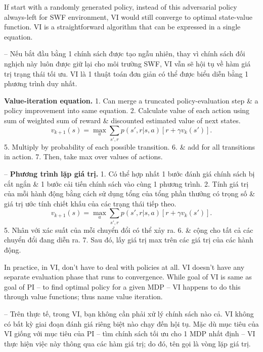 \documentclass{article}
\begin{document}
\begin{itemize}
\begin{itemize}
\begin{itemize}
            If start with a randomly generated policy, instead of this adversarial policy always-left for SWF environment, VI would still converge to optimal state-value function. VI is a straightforward algorithm that can be expressed in a single equation.

            -- Nếu bắt đầu bằng 1 chính sách được tạo ngẫu nhiên, thay vì chính sách đối nghịch này luôn được giữ lại cho môi trường SWF, VI vẫn sẽ hội tụ về hàm giá trị trạng thái tối ưu. VI là 1 thuật toán đơn giản có thể được biểu diễn bằng 1 phương trình duy nhất.

            {\bf Value-iteration equation.} 1. Can merge a truncated policy-evaluation step \& a policy improvement into same equation. 2. Calculate value of each action using sum of weighted sum of reward \& discounted estimated value of next states.
            \begin{equation*}
                v_{k+1}(s) = \max_a\sum_{s',r} p(s',r|s,a)[r + \gamma v_k(s')].
            \end{equation*}
            5. Multiply by probability of each possible transition. 6. \& add for all transitions in action. 7. Then, take max over values of actions.

            -- {\bf Phương trình lặp giá trị.} 1. Có thể hợp nhất 1 bước đánh giá chính sách bị cắt ngắn \& 1 bước cải tiến chính sách vào cùng 1 phương trình. 2. Tính giá trị của mỗi hành động bằng cách sử dụng tổng của tổng phần thưởng có trọng số \& giá trị ước tính chiết khấu của các trạng thái tiếp theo.
            \begin{equation*}
                v_{k+1}(s) = \max_a\sum_{s',r} p(s',r|s,a)[r + \gamma v_k(s')].
            \end{equation*}
            5. Nhân với xác suất của mỗi chuyển đổi có thể xảy ra. 6. \& cộng cho tất cả các chuyển đổi đang diễn ra. 7. Sau đó, lấy giá trị max trên các giá trị của các hành động.

            In practice, in VI, don't have to deal with policies at all. VI doesn't have any separate evaluation phase that runs to convergence. While goal of VI is same as goal of PI -- to find optimal policy for a given MDP -- VI happens to do this through value functions; thus name value iteration.

            -- Trên thực tế, trong VI, bạn không cần phải xử lý chính sách nào cả. VI không có bất kỳ giai đoạn đánh giá riêng biệt nào chạy đến hội tụ. Mặc dù mục tiêu của VI giống với mục tiêu của PI -- tìm chính sách tối ưu cho 1 MDP nhất định -- VI thực hiện việc này thông qua các hàm giá trị; do đó, tên gọi là vòng lặp giá trị.


\end{itemize}
\end{itemize}
\end{itemize}
\end{document}
